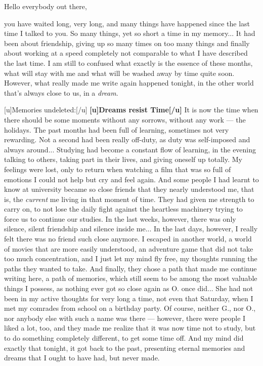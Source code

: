 Hello everybody out there, 

you have waited long, very long, and many things have happened since the last time I talked to you. So many things, yet so short a time in my memory... 
It had been about friendship, giving up so many times on too many things and finally about working at a speed completely not comparable to what I have described the last time. I am still to confused what exactly is the essence of these months, what will stay with me and what will be washed away by time quite soon. However, what really made me write again happened tonight, in the other world that's always close to us, in a \emph{dream}. 

[u]Memories undeleted:[/u]
\textbf{[u]Dreams resist Time[/u]}
It is now the time when there should be some moments without any sorrows, without any work --- the holidays. The past months had been full of learning, sometimes not very rewarding. Not a second had been really off-duty, as duty was self-imposed and always around... 
Studying had become a constant flow of learning, in the evening talking to others, taking part in their lives, and giving oneself up totally. My feelings were lost, only to return when watching a film that was so full of emotions I could not help but cry and feel again. And some people I had learnt to know at university became so close friends that they nearly understood me, that is, the \emph{current} me living in that moment of time. They had given me strength to carry on, to not lose the daily fight against the heartless machinery trying to force us to continue our studies. In the last weeks, however, there was only silence, silent friendship and silence inside me... 
In the last days, however, I really felt there was no friend such close anymore. I escaped in another world, a world of movies that are more easily understood, an adventure game that did not take too much concentration, and I just let my mind fly free, my thoughts running the paths they wanted to take. And finally, they chose a path that made me continue writing here, a path of memories, which still seem to be among the most valuable things I possess, as nothing ever got so close again as O. once did... 
She had not been in my active thoughts for very long a time, not even that Saturday, when I met my comrades from school on a birthday party. Of course, neither G., nor O., nor anybody else with such a name was there --- however, there were people I liked a lot, too, and they made me realize that it was now time not to study, but to do something completely different, to get some time off. And my mind did exactly that tonight, it got back to the past, presenting eternal memories and dreams that I ought to have had, but never made. 
